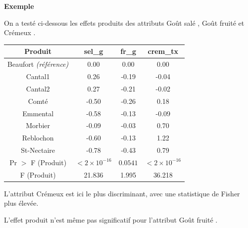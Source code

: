 \documentclass[aspectratio=169,xcolor=dvipsnames]{beamer}
\begin{document}
\begin{frame}
	\begin{exampleblock}{\textbf{Exemple}}
	\begin{scriptsize}
	On a testé ci-dessous les effets produits des attributs \og Goût salé \fg{}, \og Goût fruité \fg{} et \og Crémeux \fg{}.
	
		\begin{center}
		\begin{tabular}{cccc}
		Produit & sel\_g & fr\_g & crem\_tx \\
		\hline
		Beaufort \emph{(référence)} & 0.00 & 0.00 & 0.00 \\ 
  		Cantal1 & 0.26 & -0.19 & -0.04 \\ 
  		Cantal2 & 0.27 & -0.21 & -0.02 \\ 
  		Comté & -0.50 & -0.26 & 0.18 \\ 
  		Emmental & -0.58 & -0.13 & -0.09 \\ 
  		Morbier & -0.09 & -0.03 & 0.70 \\ 
  		Reblochon & -0.60 & -0.13 & 1.22 \\ 
  		St-Nectaire & -0.78 & -0.43 & 0.79 \\ 
  		\hline
  		Pr $>$ F (Produit) & $<2\times 10^{-16}$ & $0.0541$ & $<2\times 10^{-16}$ \\
  		F (Produit)& 21.836 & 1.995 & 36.218
		\end{tabular}	
		\end{center}
	L'attribut \og Crémeux \fg{} est ici le plus discriminant, avec une statistique de Fisher plus élevée. 
	
	\medskip
	
	L'effet produit n'est même pas significatif pour l'attribut \og Goût fruité \fg{}. 
	\end{scriptsize}
	\end{exampleblock}
\end{frame}
\end{document}
